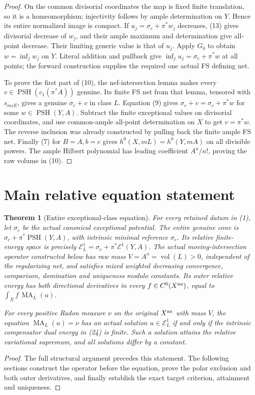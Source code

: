 \documentclass[11pt]{article}
\newcommand{\PSH}{\operatorname{PSH}}
\newcommand{\vol}{\operatorname{vol}}
\newcommand{\MA}{\operatorname{MA}}
\newtheorem{theorem}{Theorem}
\begin{document}
\begin{proof}
On the common divisorial coordinates the map is fixed finite
translation, so it is a homeomorphism; injectivity follows by
ample determination on $Y$. Hence its entire normalized image is
compact. If $u_j=\sigma_c+\pi^*w_j$ decreases, (13) gives
divisorial decrease of $w_j$, and their ample maximum and
determination give all-point decrease. Their limiting generic
value is that of $u_j$. Apply $G_0$ to obtain
$w=\inf_j w_j$ on $Y$. Literal addition and pullback give
$\inf_j u_j=\sigma_c+\pi^*w$ at all points; the forward
construction supplies the required one actual FS defining net.

To prove the first part of (10), the nef-intersection lemma makes
every $v\in\PSH(c_1(\pi^*A))$ genuine. Its finite FS net from
that lemma, tensored with $s_{mcE}$, gives a genuine
$\sigma_c+v$ in class $L$. Equation (9) gives
$\sigma_c+v=\sigma_c+\pi^*w$ for some $w\in\PSH(Y,A)$.
Subtract the finite exceptional values on divisorial coordinates,
and use common-ample all-point determination on $X$ to get
$v=\pi^*w$. The reverse inclusion was already constructed by
pulling back the finite ample FS net. Finally (7) for $B=A,b=c$
gives $h^0(X,mL)=h^0(Y,mA)$ on all divisible powers. The ample
Hilbert polynomial has leading coefficient $A^n/n!$, proving
the raw volume in (10).
\end{proof}


\section{Main relative equation statement}
\begin{theorem}[Entire exceptional-class equation]
For every retained datum in (1), let $\sigma_c$ be the actual
canonical exceptional potential. The entire genuine cone is
$\sigma_c+\pi^*\PSH(Y,A)$, with intrinsic minimal reference
$\sigma_c$. Its relative finite-energy space is precisely
$\mathcal E_L^1=\sigma_c+\pi^*\mathcal E^1(Y,A)$.
The actual moving-intersection operator constructed below has raw
mass $V=A^n=\vol(L)>0$, independent of the regularizing net, and
satisfies mixed weighted decreasing convergence, comparison,
domination and uniqueness modulo constants. Its outer relative
energy has both directional derivatives in every
$f\in C^0(X^{\rm an})$, equal to $\int_X f\,\MA_L(u)$.

For every positive Radon measure $\nu$ on the original $X^{\rm an}$
with mass $V$, the equation $\MA_L(u)=\nu$ has an actual solution
$u\in\mathcal E_L^1$ if and only if the intrinsic compensator
dual energy in (24) is finite. Such a solution attains the relative
variational supremum, and all solutions differ by a constant.
\end{theorem}
\begin{proof}
The full structural argument precedes this statement. The following
sections construct the operator before the equation, prove the
polar exclusion and both outer derivatives, and finally establish
the exact target criterion, attainment and uniqueness.
\end{proof}
\end{document}
